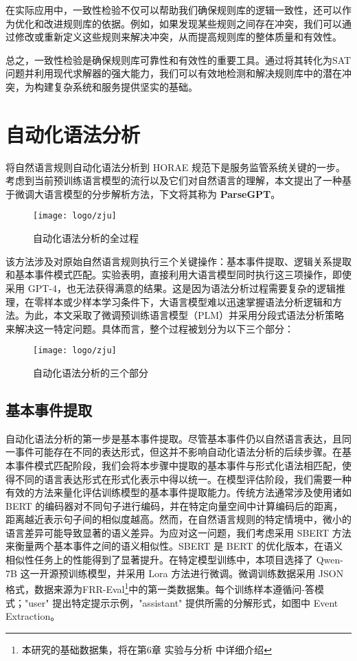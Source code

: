 在实际应用中，一致性检验不仅可以帮助我们确保规则库的逻辑一致性，还可以作为优化和改进规则库的依据。例如，如果发现某些规则之间存在冲突，我们可以通过修改或重新定义这些规则来解决冲突，从而提高规则库的整体质量和有效性。

总之，一致性检验是确保规则库可靠性和有效性的重要工具。通过将其转化为SAT问题并利用现代求解器的强大能力，我们可以有效地检测和解决规则库中的潜在冲突，为构建复杂系统和服务提供坚实的基础。

\cleardoublepage

\section{自动化语法分析}\label{自动化语法分析}

将自然语言规则自动化语法分析到 HORAE 规范下是服务监管系统关键的一步。考虑到当前预训练语言模型的流行以及它们对自然语言的理解，本文提出了一种基于微调大语言模型的分步解析方法，下文将其称为 \textbf{ParseGPT}。

\begin{figure*}[ht]
\centering
\texttt{[image: logo/zju]}
\caption{自动化语法分析的全过程}
\end{figure*}
该方法涉及对原始自然语言规则执行三个关键操作：基本事件提取、逻辑关系提取和基本事件模式匹配。实验表明，直接利用大语言模型同时执行这三项操作，即使采用 GPT-4，也无法获得满意的结果。这是因为语法分析过程需要复杂的逻辑推理，在零样本或少样本学习条件下，大语言模型难以迅速掌握语法分析逻辑和方法。为此，本文采取了微调预训练语言模型（PLM）并采用分段式语法分析策略来解决这一特定问题。具体而言，整个过程被划分为以下三个部分：
\begin{figure*}[ht]
    \centering
    \texttt{[image: logo/zju]}
    \caption{自动化语法分析的三个部分}
    \end{figure*}
\subsection{基本事件提取}
自动化语法分析的第一步是基本事件提取。尽管基本事件仍以自然语言表达，且同一事件可能存在不同的表达形式，但这并不影响自动化语法分析的后续步骤。在基本事件模式匹配阶段，我们会将本步骤中提取的基本事件与形式化语法相匹配，使得不同的语言表达形式在形式化表示中得以统一。在模型评估阶段，我们需要一种有效的方法来量化评估训练模型的基本事件提取能力。传统方法通常涉及使用诸如 BERT 的编码器对不同句子进行编码，并在特定向量空间中计算编码后的距离，距离越近表示句子间的相似度越高。然而，在自然语言规则的特定情境中，微小的语言差异可能导致显著的语义差异。为应对这一问题，我们考虑采用 SBERT 方法来衡量两个基本事件之间的语义相似性。SBERT 是 BERT 的优化版本，在语义相似性任务上的性能得到了显著提升。在特定模型训练中，本项目选择了 Qwen-7B 这一开源预训练模型，并采用 Lora 方法进行微调。微调训练数据采用 JSON 格式，数据来源为FRR-Eval\footnote{本研究的基础数据集，将在第6章 实验与分析 中详细介绍}中的第一类数据集。每个训练样本遵循问-答模式；"user" 提出特定提示示例，"assistant" 提供所需的分解形式，如图中 Event Extraction。

